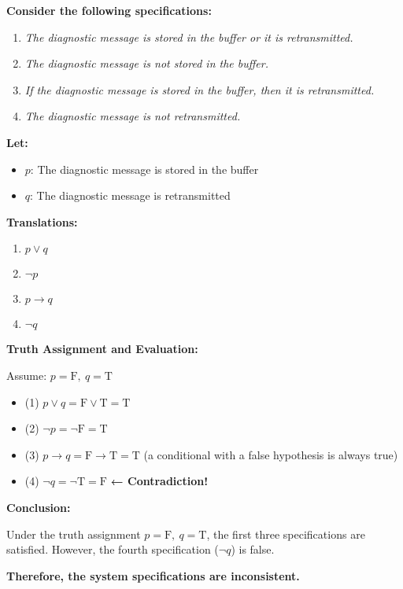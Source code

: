 \begin{tcolorbox}[title=Example 3: Determine Consistency of System Specifications (2)]
\textbf{Consider the following specifications:}
\begin{enumerate}
    \item \textit{The diagnostic message is stored in the buffer or it is retransmitted.}
    \item \textit{The diagnostic message is not stored in the buffer.}
    \item \textit{If the diagnostic message is stored in the buffer, then it is retransmitted.}
    \item \textit{The diagnostic message is not retransmitted.}
\end{enumerate}

\textbf{Let:}
\begin{itemize}
  \item $p$: The diagnostic message is stored in the buffer
  \item $q$: The diagnostic message is retransmitted
\end{itemize}

\vspace{0.5em}

\textbf{Translations:}
\begin{enumerate}
    \item $p \lor q$
    \item $\neg p$
    \item $p \rightarrow q$
    \item $\neg q$
\end{enumerate}

\textbf{Truth Assignment and Evaluation:}

Assume: \( p = \text{F},\ q = \text{T} \)

\begin{itemize}
    \item (1) \( p \lor q = \text{F} \lor \text{T} = \text{T} \)
    \item (2) \( \neg p = \neg \text{F} = \text{T} \)
    \item (3) \( p \rightarrow q = \text{F} \rightarrow \text{T} = \text{T} \) (a conditional with a false hypothesis is always true)
    \item (4) \( \neg q = \neg \text{T} = \text{F} \) \textbf{← Contradiction!}
\end{itemize}

\textbf{Conclusion:}

Under the truth assignment \( p = \text{F},\ q = \text{T} \), the first three specifications are satisfied.  
However, the fourth specification (\( \neg q \)) is false.  

\textbf{Therefore, the system specifications are inconsistent.}
\end{tcolorbox}

